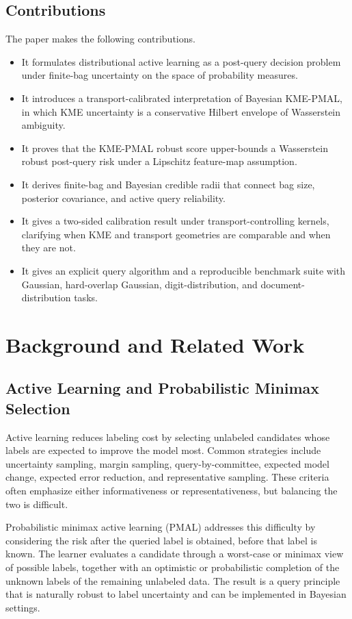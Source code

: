 \documentclass[10pt,journal]{IEEEtran}
\begin{document}
\subsection{Contributions}

The paper makes the following contributions.
\begin{itemize}[leftmargin=1.1em]
    \item It formulates distributional active learning as a post-query decision problem under finite-bag uncertainty on the space of probability measures.
    \item It introduces a transport-calibrated interpretation of Bayesian KME-PMAL, in which KME uncertainty is a conservative Hilbert envelope of Wasserstein ambiguity.
    \item It proves that the KME-PMAL robust score upper-bounds a Wasserstein robust post-query risk under a Lipschitz feature-map assumption.
    \item It derives finite-bag and Bayesian credible radii that connect bag size, posterior covariance, and active query reliability.
    \item It gives a two-sided calibration result under transport-controlling kernels, clarifying when KME and transport geometries are comparable and when they are not.
    \item It gives an explicit query algorithm and a reproducible benchmark suite with Gaussian, hard-overlap Gaussian, digit-distribution, and document-distribution tasks.
\end{itemize}

\section{Background and Related Work}
\label{sec:related}

\subsection{Active Learning and Probabilistic Minimax Selection}

Active learning reduces labeling cost by selecting unlabeled candidates whose labels are expected to improve the model most. Common strategies include uncertainty sampling, margin sampling, query-by-committee, expected model change, expected error reduction, and representative sampling. These criteria often emphasize either informativeness or representativeness, but balancing the two is difficult.

Probabilistic minimax active learning (PMAL) addresses this difficulty by considering the risk after the queried label is obtained, before that label is known. The learner evaluates a candidate through a worst-case or minimax view of possible labels, together with an optimistic or probabilistic completion of the unknown labels of the remaining unlabeled data. The result is a query principle that is naturally robust to label uncertainty and can be implemented in Bayesian settings.
\end{document}
